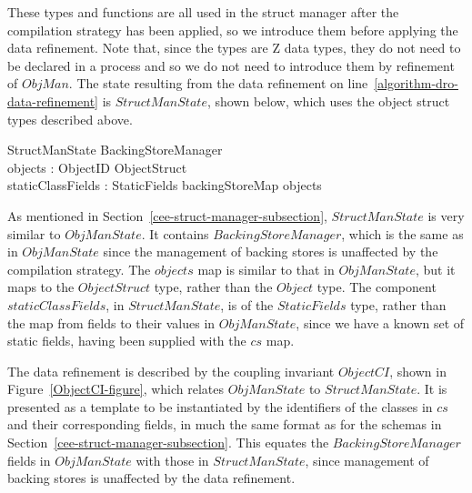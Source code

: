These types and functions are all used in the struct manager after the
compilation strategy has been applied, so we introduce them before
applying the data refinement.
Note that, since the types are Z data types, they do not need to be
declared in a process and so we do not need to introduce them by
refinement of $ObjMan$.
The state resulting from the data refinement on
line~\ref{algorithm-dro-data-refinement} is $StructManState$,
shown below, which uses the object struct types described above.
\begin{schema}{StructManState}
  BackingStoreManager \\
  objects : ObjectID \pfun ObjectStruct \\
  staticClassFields : StaticFields
\where
  backingStoreMap \partition \dom objects 
\end{schema}
As mentioned in Section~\ref{cee-struct-manager-subsection},
$StructManState$ is very similar to $ObjManState$.
It contains $BackingStoreManager$, which is the same as in
$ObjManState$ since the management of backing stores is unaffected by
the compilation strategy.
The $objects$ map is similar to that in $ObjManState$, but it maps to
the $ObjectStruct$ type, rather than the $Object$ type.
The component $staticClassFields$, in $StructManState$, is of the
$StaticFields$ type, rather than the map from fields to their values
in $ObjManState$, since we have a known set of static fields, having
been supplied with the $cs$ map.

The data refinement is described by the coupling invariant $ObjectCI$,
shown in Figure~\ref{ObjectCI-figure}, which relates $ObjManState$ to
$StructManState$.
It is presented as a template to be instantiated by the identifiers of
the classes in $cs$ and their corresponding fields, in much the same
format as for the schemas in
Section~\ref{cee-struct-manager-subsection}.
This equates the $BackingStoreManager$ fields in $ObjManState$ with
those in $StructManState$, since management of backing stores is
unaffected by the data refinement.

